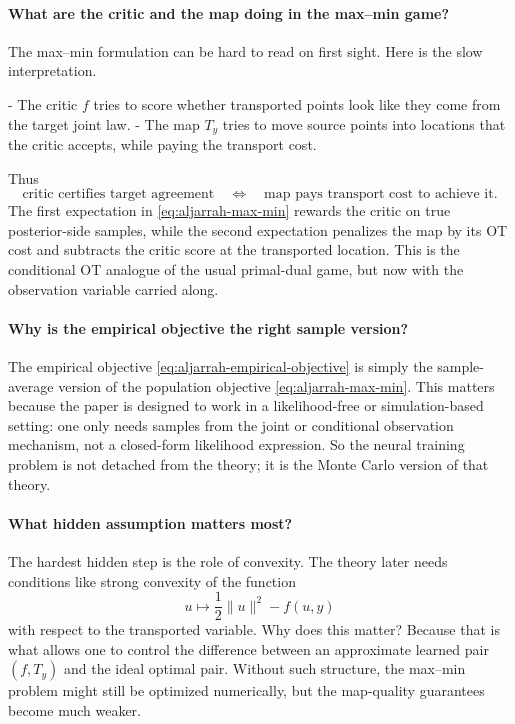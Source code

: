 \documentclass[11pt]{report}
\begin{document}
\paragraph{What are the critic and the map doing in the max--min game?}
The max--min formulation can be hard to read on first sight.  Here is the slow
interpretation.

- The critic $f$ tries to score whether transported points look like they come from
  the target joint law.
- The map $T_y$ tries to move source points into locations that the critic accepts,
  while paying the transport cost.

Thus
\begin{equation}
\text{critic certifies target agreement}
\quad\Longleftrightarrow\quad
\text{map pays transport cost to achieve it}.
\label{eq:critic-map-division}
\end{equation}
The first expectation in \eqref{eq:aljarrah-max-min} rewards the critic on true
posterior-side samples, while the second expectation penalizes the map by its OT
cost and subtracts the critic score at the transported location.  This is the
conditional OT analogue of the usual primal-dual game, but now with the observation
variable carried along.

\paragraph{Why is the empirical objective the right sample version?}
The empirical objective \eqref{eq:aljarrah-empirical-objective} is simply the
sample-average version of the population objective \eqref{eq:aljarrah-max-min}.
This matters because the paper is designed to work in a likelihood-free or
simulation-based setting: one only needs samples from the joint or conditional
observation mechanism, not a closed-form likelihood expression.  So the neural
training problem is not detached from the theory; it is the Monte Carlo version of
that theory.

\paragraph{What hidden assumption matters most?}
The hardest hidden step is the role of convexity.  The theory later needs
conditions like strong convexity of the function
\begin{equation}
u \mapsto \frac12\|u\|^2 - f(u,y)
\label{eq:aljarrah-strong-convexity-bridge}
\end{equation}
with respect to the transported variable.  Why does this matter?  Because that is
what allows one to control the difference between an approximate learned pair
$(f,T_y)$ and the ideal optimal pair.  Without such structure, the max--min problem
might still be optimized numerically, but the map-quality guarantees become much
weaker.
\end{document}
